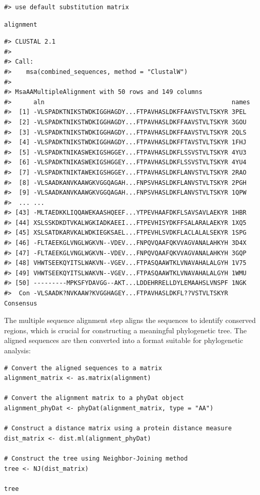 \begin{verbatim}
#> use default substitution matrix
\end{verbatim}

\begin{verbatim}
alignment
\end{verbatim}

\begin{verbatim}
#> CLUSTAL 2.1  
#> 
#> Call:
#>    msa(combined_sequences, method = "ClustalW")
#> 
#> MsaAAMultipleAlignment with 50 rows and 149 columns
#>      aln                                                   names
#>  [1] -VLSPADKTNIKSTWDKIGGHAGDY...FTPAVHASLDKFFAAVSTVLTSKYR 3PEL
#>  [2] -VLSPADKTNIKSTWDKIGGHAGDY...FTPAVHASLDKFFAAVSTVLTSKYR 3GOU
#>  [3] -VLSPADKTNIKSTWDKIGGHAGDY...FTPAVHASLDKFFAAVSTVLTSKYR 2QLS
#>  [4] -VLSPADKTNIKSTWDKIGGHAGDY...FTPAVHASLDKFFTAVSTVLTSKYR 1FHJ
#>  [5] -VLSPADKTNIKASWEKIGSHGGEY...FTPAVHASLDKFLSSVSTVLTSKYR 4YU3
#>  [6] -VLSPADKTNIKASWEKIGSHGGEY...FTPAVHASLDKFLSSVSTVLTSKYR 4YU4
#>  [7] -VLSPADKTNIKTAWEKIGSHGGEY...FTPAVHASLDKFLANVSTVLTSKYR 2RAO
#>  [8] -VLSAADKANVKAAWGKVGGQAGAH...FNPSVHASLDKFLANVSTVLTSKYR 2PGH
#>  [9] -VLSAADKANVKAAWGKVGGQAGAH...FNPSVHASLDKFLANVSTVLTSKYR 1QPW 
#>  ... ...
#> [43] -MLTAEDKKLIQQAWEKAASHQEEF...YTPEVHAAFDKFLSAVSAVLAEKYR 1HBR
#> [44] XSLSSKDKDTVKALWGKIADKAEEI...FTPEVHISYDKFFSALARALAEKYR 1XQ5
#> [45] XSLSATDKARVKALWDKIEGKSAEL...FTPEVHLSVDKFLACLALALSEKYR 1SPG
#> [46] -FLTAEEKGLVNGLWGKVN--VDEV...FNPQVQAAFQKVVAGVANALAHKYH 3D4X
#> [47] -FLTAEEKGLVNGLWGKVN--VDEV...FNPQVQAAFQKVVAGVANALAHKYH 3GQP
#> [48] VHWTSEEKQYITSLWAKVN--VGEV...FTPASQAAWTKLVNAVAHALALGYH 1V75
#> [49] VHWTSEEKQYITSLWAKVN--VGEV...FTPASQAAWTKLVNAVAHALALGYH 1WMU
#> [50] ---------MPKSFYDAVGG--AKT...LDDEHRRELLDYLEMAAHSLVNSPF 1NGK
#>  Con -VLSAADK?NVKAAW?KVGGHAGEY...FTPAVHASLDKFL??VSTVLTSKYR Consensus
\end{verbatim}

The multiple sequence alignment step aligns the sequences to identify conserved regions, which is crucial for constructing a meaningful phylogenetic tree. The aligned sequences are then converted into a format suitable for phylogenetic analysis:

\begin{verbatim}
# Convert the aligned sequences to a matrix
alignment_matrix <- as.matrix(alignment)

# Convert the alignment matrix to a phyDat object
alignment_phyDat <- phyDat(alignment_matrix, type = "AA")

# Construct a distance matrix using a protein distance measure
dist_matrix <- dist.ml(alignment_phyDat)

# Construct the tree using Neighbor-Joining method
tree <- NJ(dist_matrix)

tree
\end{verbatim}

